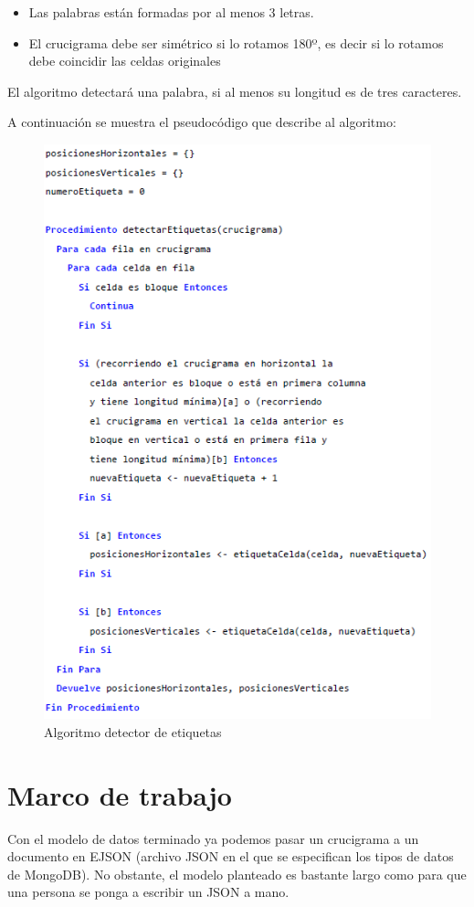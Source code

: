 \documentclass[12pt, a4paper]{article}
\begin{document}
\begin{itemize}
	\item Las palabras están formadas por al menos 3 letras.
	\item El crucigrama debe ser simétrico si lo rotamos 180º, es decir si lo 
	rotamos debe coincidir las celdas originales
\end{itemize}

El algoritmo detectará una palabra, si al menos su longitud es de tres caracteres.

A continuación se muestra el pseudocódigo \cite{pseudocode} que describe al
algoritmo:

\begin{figure}[h]
	\centering
	\label{fig:detectLabels}
	\includegraphics[width=0.7\linewidth]{img/pseudocode.png}
	\caption{Algoritmo detector de etiquetas}
\end{figure}


\section{Marco de trabajo}

Con el modelo de datos terminado ya podemos pasar un crucigrama a un
documento en EJSON \cite{EJSON} (archivo JSON en el que se especifican
los tipos de datos de MongoDB). No obstante, el modelo planteado es bastante largo
como para que una persona se ponga a escribir un JSON a mano.
\end{document}
